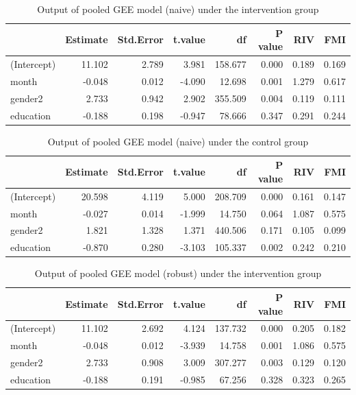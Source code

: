\begin{table}[H]
\centering
\begin{tabular}{|l|r|r|r|r|r|r|r|}
\hline
  & Estimate & Std.Error & t.value & df & P value & RIV & FMI\\
\hline
(Intercept) & 11.102 & 2.789 & 3.981 & 158.677 & 0.000 & 0.189 & 0.169\\
\hline
month & -0.048 & 0.012 & -4.090 & 12.698 & 0.001 & 1.279 & 0.617\\
\hline
gender2 & 2.733 & 0.942 & 2.902 & 355.509 & 0.004 & 0.119 & 0.111\\
\hline
education & -0.188 & 0.198 & -0.947 & 78.666 & 0.347 & 0.291 & 0.244\\
\hline
\end{tabular}
\caption{Output of pooled GEE model (naive) under the intervention group}
\label{tab:gee.treatment.mi.naive}
\end{table}

\begin{table}[H]
\centering
\begin{tabular}{|l|r|r|r|r|r|r|r|}
\hline
  & Estimate & Std.Error & t.value & df & P value & RIV & FMI\\
\hline
(Intercept) & 20.598 & 4.119 & 5.000 & 208.709 & 0.000 & 0.161 & 0.147\\
\hline
month & -0.027 & 0.014 & -1.999 & 14.750 & 0.064 & 1.087 & 0.575\\
\hline
gender2 & 1.821 & 1.328 & 1.371 & 440.506 & 0.171 & 0.105 & 0.099\\
\hline
education & -0.870 & 0.280 & -3.103 & 105.337 & 0.002 & 0.242 & 0.210\\
\hline
\end{tabular}
\caption{Output of pooled GEE model (naive) under the control group}
\label{tab:gee.control.mi.naive}
\end{table}

\begin{table}[H]
\centering
\begin{tabular}{|l|r|r|r|r|r|r|r|}
\hline
  & Estimate & Std.Error & t.value & df & P value & RIV & FMI\\
\hline
(Intercept) & 11.102 & 2.692 & 4.124 & 137.732 & 0.000 & 0.205 & 0.182\\
\hline
month & -0.048 & 0.012 & -3.939 & 14.758 & 0.001 & 1.086 & 0.575\\
\hline
gender2 & 2.733 & 0.908 & 3.009 & 307.277 & 0.003 & 0.129 & 0.120\\
\hline
education & -0.188 & 0.191 & -0.985 & 67.256 & 0.328 & 0.323 & 0.265\\
\hline
\end{tabular}
\caption{Output of pooled GEE model (robust) under the intervention group}
\label{tab:gee.treatment.mi.robust}
\end{table}


